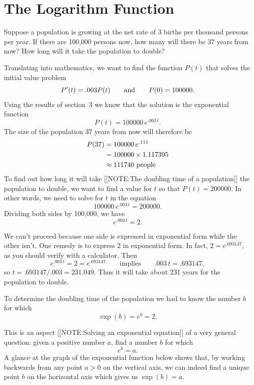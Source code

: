 \section{The Logarithm Function}
\label{sec:the-logarithm-function}

Suppose a population is growing at the net rate of 3 births per
thousand persons per year.  If there are 100,000 persons now, how many
will there be 37 years from now?  How long will it take the population
to double?

Translating into mathematics, we want to find the function $P(t)$ that
solves the initial value problem
	\[
P'(t) = .003P(t) \qquad \hbox{and} \qquad 
		P(0) = 100000.
\] 
Using the results of section~3 we know that the solution is the exponential
function
	\[
P(t) = 100000\,e^{.003\,t}.
\] 
The size of the population 37 years from now will therefore be 
\begin{align*}
	P(37) & =  100000\,e^{.111} \\
	      & =  100000 \times  1.117395 \\
	      & \approx  111740 \hbox{ people}
\end{align*}
To find out how long it will take 
[[NOTE:The doubling time  of a population]]
the population to double, we want to find a value
for $t$ so that $P(t) = 200000$.  In other words, we need to solve for
$t$ in the equation
	\[
100000\,e^{.003\,t} = 200000.
\]
Dividing both sides by 100,000, we have
	\[
e^{.003\,t} = 2.
\]

	We can't proceed because one side is expressed in exponential form while the other isn't.  One remedy is to express 2 in exponential form.  In fact, $2 = e^{.693147}$, as you should verify with a calculator.  Then 
	\[
e^{.003\,t} = 2 = e^{.693147}
	 \qquad \mbox{implies} \qquad .003\,t = .693147,
\]
so $t = .693147/.003 = 231.049$.  Thus it will take about 231 years for the population to double.



	To determine the doubling time of the population we had to know the number $b$ for which
	\[
\exp(b) = e^{\displaystyle b} = 2.
\]

This is an aspect 
[[NOTE:Solving an  exponential equation]]
of a very general question: given a positive number $a$, find a number
$b$ for which
	\[
e^{\displaystyle b} = a.
\]
A glance at the graph of the exponential function below shows that, by working backwards from any point $a>0$ on the vertical axis, we can indeed find a unique point $b$ on the horizontal axis which gives us $\exp(b) = a$.

